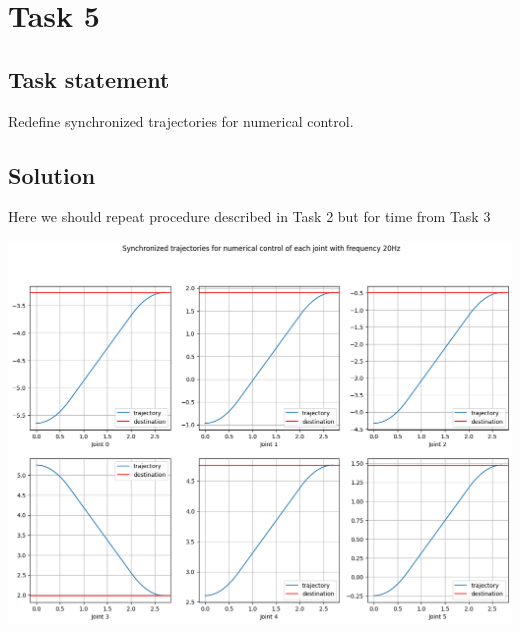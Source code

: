 \section*{Task 5}

\subsection*{Task statement}

Redefine synchronized trajectories for numerical control.

\subsection*{Solution}

Here we should repeat procedure described in Task 2 but for time from Task 3

\includegraphics[width=\linewidth]{images/trajectory_numerical.png}